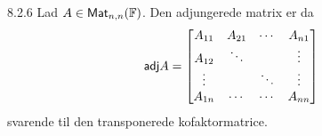 \begin{definition}{8.2.6}
	Lad $A \in \textsf{Mat}_{n,n}(\mathbb{F})$. Den adjungerede matrix er da
	\[
		\textsf{adj} A = 
		\begin{bmatrix}
			A_{11} & A_{21} & \cdots & A_{n1}\\
			A_{12} & \ddots &  & \vdots \\
			\vdots &  & \ddots & \vdots \\
			A_{1n} & \cdots & \cdots & A_{nn}
		\end{bmatrix}
	\]
	svarende til den transponerede kofaktormatrice.
\end{definition}
